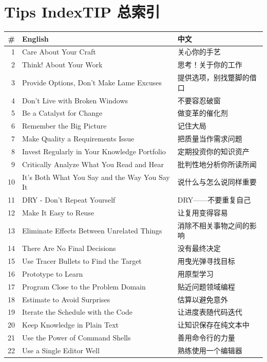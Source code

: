 \chapter{Tips Index\quad TIP 总索引}

\begin{longtable}{@{}r p{} p{}@{}}
\toprule
\textbf{\#} & \textbf{English} & \textbf{中文} \\
\midrule
\endhead
1 & Care About Your Craft & 关心你的手艺 \\
2 & Think! About Your Work & 思考！关于你的工作 \\
3 & Provide Options, Don't Make Lame Excuses & 提供选项，别找蹩脚的借口 \\
4 & Don't Live with Broken Windows & 不要容忍破窗 \\
5 & Be a Catalyst for Change & 做变革的催化剂 \\
6 & Remember the Big Picture & 记住大局 \\
7 & Make Quality a Requirements Issue & 把质量当作需求问题 \\
8 & Invest Regularly in Your Knowledge Portfolio & 定期投资你的知识资产 \\
9 & Critically Analyze What You Read and Hear & 批判性地分析你所读所闻 \\
10 & It's Both What You Say and the Way You Say It & 说什么与怎么说同样重要 \\
11 & DRY - Don't Repeat Yourself & DRY——不要重复自己 \\
12 & Make It Easy to Reuse & 让复用变得容易 \\
13 & Eliminate Effects Between Unrelated Things & 消除不相关事物之间的影响 \\
14 & There Are No Final Decisions & 没有最终决定 \\
15 & Use Tracer Bullets to Find the Target & 用曳光弹寻找目标 \\
16 & Prototype to Learn & 用原型学习 \\
17 & Program Close to the Problem Domain & 贴近问题领域编程 \\
18 & Estimate to Avoid Surprises & 估算以避免意外 \\
19 & Iterate the Schedule with the Code & 让进度表随代码迭代 \\
20 & Keep Knowledge in Plain Text & 让知识保存在纯文本中 \\
21 & Use the Power of Command Shells & 善用命令行的力量 \\
22 & Use a Single Editor Well & 熟练使用一个编辑器 \\

\end{longtable}
